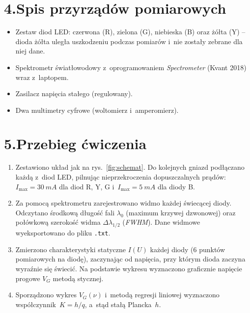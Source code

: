 \documentclass[a4paper,12pt]{article}
\begin{document}
\section*{4.\quad Spis przyrządów pomiarowych}

\begin{itemize}
  \item Zestaw diod LED: czerwona (R), zielona (G), niebieska (B) oraz żółta (Y)
        -- dioda żółta uległa uszkodzeniu podczas pomiarów i~nie zostały zebrane
        dla niej dane.
  \item Spektrometr światłowodowy z~oprogramowaniem \textit{Spectrometer} (Kvant 2018)
        wraz z~laptopem.
  \item Zasilacz napięcia stałego (regulowany).
  \item Dwa multimetry cyfrowe (woltomierz i~amperomierz).
\end{itemize}

\section*{5.\quad Przebieg ćwiczenia}

\begin{enumerate}
  \item Zestawiono układ jak na rys.~\ref{fig:schemat}. Do kolejnych gniazd podłączano
        każdą z~diod LED, pilnując nieprzekroczenia dopuszczalnych prądów:
        $I_\text{max} = \SI{30}{mA}$ dla diod R, Y, G i~$I_\text{max} = \SI{5}{mA}$
        dla diody B.
  \item Za pomocą spektrometru zarejestrowano widmo każdej świecącej diody.
        Odczytano środkową długość fali $\lambda_0$ (maximum krzywej dzwonowej) oraz
        połówkową szerokość widma $\Delta\lambda_{1/2}$ (\textit{FWHM}).
        Dane widmowe wyeksportowano do pliku \texttt{.txt}.
  \item Zmierzono charakterystyki statyczne $I(U)$ każdej diody (6 punktów pomiarowych
        na diodę), zaczynając od napięcia, przy którym dioda zaczyna wyraźnie się
        świecić. Na podstawie wykresu wyznaczono graficznie napięcie progowe $V_G$
        metodą stycznej.
  \item Sporządzono wykres $V_G(\nu)$ i~metodą regresji liniowej wyznaczono
        współczynnik~$K = h/q$, a~stąd stałą Plancka~$h$.
\end{enumerate}
\end{document}
